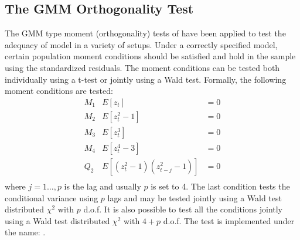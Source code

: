 \subsection{The GMM Orthogonality Test}
The GMM type moment (orthogonality) tests of \cite{Hansen1982} have been applied
to test the adequacy of model in a variety of setups. Under a correctly
specified model, certain population moment conditions should be satisfied and
hold in the sample using the standardized residuals. The moment conditions can
be tested both individually using a t-test or jointly using a Wald test. Formally,
the following moment conditions are tested:
\begin{equation}\label{eq:gmm}
\begin{array}{*{20}{c}}
{{M_1}}&{E\left[ {{z_t}} \right]}&{ = 0}\\
{{M_2}}&{E\left[ {z_t^2 - 1} \right]}&{ = 0}\\
{{M_3}}&{E\left[ {z_t^3} \right]}&{ = 0}\\
{{M_4}}&{E\left[ {z_t^4 - 3} \right]}&{ = 0}\\
{{Q_2}}&{E\left[ {\left( {z_t^2 - 1} \right)\left( {z_{t - j}^2 - 1} \right)} \right]}&{ = 0}\\
\end{array}
\end{equation}
where $j=1\dots,p$ is the lag and usually $p$ is set to 4. The last condition
tests the conditional variance using $p$ lags and may be
tested jointly using a Wald test distributed $\chi^2$ with $p$ d.o.f. It is also
possible to test all the conditions jointly using a Wald test distributed $\chi^2$
with $4+p$ d.o.f. The test is implemented under the name: \verb@GMMTest@.
